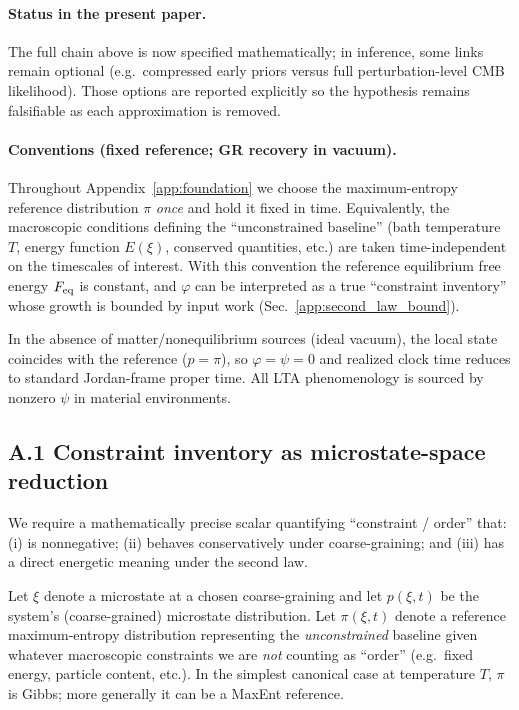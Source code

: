 \documentclass[10pt]{article}
\begin{document}
\paragraph{Status in the present paper.}
The full chain above is now specified mathematically; in inference, some links remain optional
(e.g.\ compressed early priors versus full perturbation-level CMB likelihood). Those options are
reported explicitly so the hypothesis remains falsifiable as each approximation is removed.


\paragraph{Conventions (fixed reference; GR recovery in vacuum).}
Throughout Appendix~\ref{app:foundation} we choose the maximum-entropy reference distribution $\pi$
\emph{once} and hold it fixed in time. Equivalently, the macroscopic conditions defining the
``unconstrained baseline'' (bath temperature $T$, energy function $E(\xi)$, conserved quantities,
etc.) are taken time-independent on the timescales of interest. With this convention the reference
equilibrium free energy $F_{\rm eq}$ is constant, and $\varphi$ can be interpreted as a true
``constraint inventory'' whose growth is bounded by input work (Sec.~\ref{app:second_law_bound}).

In the absence of matter/nonequilibrium sources (ideal vacuum), the local state coincides with the
reference ($p=\pi$), so $\varphi=\psi=0$ and realized clock time reduces to standard Jordan-frame proper time.
All LTA phenomenology is sourced by nonzero $\psi$ in material environments.


\subsection{A.1 Constraint inventory as microstate-space reduction}
\label{app:constraint_inventory}

We require a mathematically precise scalar quantifying ``constraint / order'' that:
(i) is nonnegative; (ii) behaves conservatively under coarse-graining; and (iii) has a direct
energetic meaning under the second law.

Let $\xi$ denote a microstate at a chosen coarse-graining and let $p(\xi,t)$ be the system’s
(coarse-grained) microstate distribution. Let $\pi(\xi,t)$ denote a reference maximum-entropy
distribution representing the \emph{unconstrained} baseline given whatever macroscopic constraints
we are \emph{not} counting as ``order'' (e.g.\ fixed energy, particle content, etc.). In the simplest
canonical case at temperature $T$, $\pi$ is Gibbs; more generally it can be a MaxEnt reference.
\end{document}
